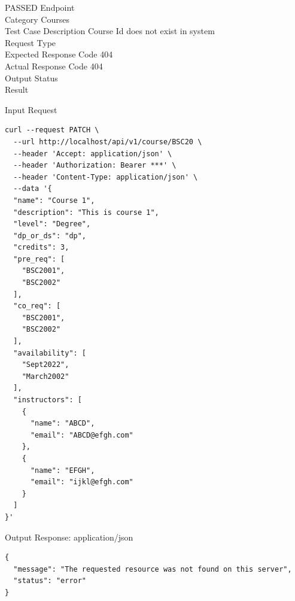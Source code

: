 \begin{testcase}{68}{PASSED}
Endpoint \hfill {}\\
Category \hfill Courses\\
Test Case Description \hfill Course Id does not exist in system\\

Request Type    \hfill {}\\
Expected Response Code    \hfill 404\\
Actual Response Code    \hfill 404\\

Output Status \hfill {}\\
Result \hfill {}

\begin{ipblock}{Input Request}
\begin{verbatim}
curl --request PATCH \
  --url http://localhost/api/v1/course/BSC20 \
  --header 'Accept: application/json' \
  --header 'Authorization: Bearer ***' \
  --header 'Content-Type: application/json' \
  --data '{
  "name": "Course 1",
  "description": "This is course 1",
  "level": "Degree",
  "dp_or_ds": "dp",
  "credits": 3,
  "pre_req": [
    "BSC2001",
    "BSC2002"
  ],
  "co_req": [
    "BSC2001",
    "BSC2002"
  ],
  "availability": [
    "Sept2022",
    "March2002"
  ],
  "instructors": [
    {
      "name": "ABCD",
      "email": "ABCD@efgh.com"
    },
    {
      "name": "EFGH",
      "email": "ijkl@efgh.com"
    }
  ]
}'
\end{verbatim}
\end{ipblock}

\begin{opblock}{Output Response: application/json}
\begin{verbatim}
{
  "message": "The requested resource was not found on this server",
  "status": "error"
}
\end{verbatim}
\end{opblock}
\end{testcase}

